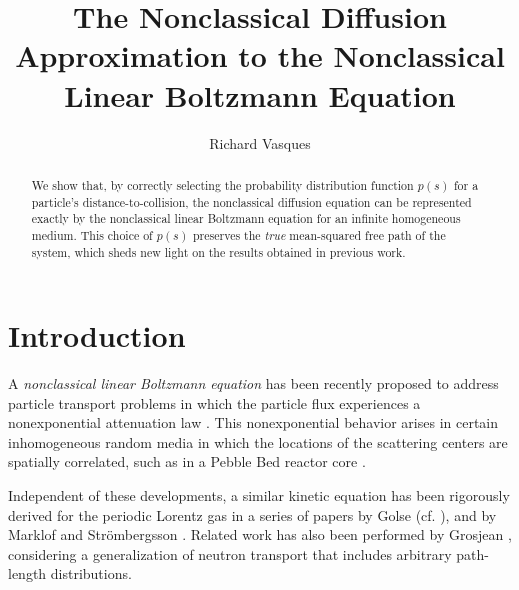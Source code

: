 \documentclass[preprint,12pt]{elsarticle}
\begin{document}
\begin{frontmatter}


\title{The Nonclassical Diffusion Approximation to the Nonclassical Linear Boltzmann Equation}

\author[ucb]{Richard Vasques}
\address[ucb]{Department of Nuclear Engineering, University of California, Berkeley}

\begin{abstract}

We show that, by correctly selecting the probability distribution function $p(s)$ for a particle's distance-to-collision, the nonclassical diffusion equation can be represented exactly by the nonclassical linear Boltzmann equation for an infinite homogeneous medium. This choice of $p(s)$ preserves the \textit{true} mean-squared free path of the system, which sheds new light on the results obtained in previous work.

\end{abstract}



\end{frontmatter}

\section{Introduction}\label{sec1}
\setcounter{section}{1}
\setcounter{equation}{0} 

A \textit{nonclassical linear Boltzmann equation} has been recently proposed to address particle transport problems in which the particle flux experiences a nonexponential attenuation law \cite{larsen_11, frank_10, vasques_14a}. This nonexponential behavior arises in certain inhomogeneous random media in which the locations of the scattering centers are spatially correlated, such as in a Pebble Bed reactor core \cite{larsen_11, vasques_13, vasques_14b}. 

Independent of these developments, a similar kinetic equation has been
rigorously derived for the periodic Lorentz gas in a series of papers by Golse (cf. \cite{golse_12}), and by Marklof and Str\" ombergsson \cite{marklof_11, marklof_15}. Related work has also been performed by Grosjean \cite{grosjean_51}, considering a generalization of
neutron transport that includes arbitrary path-length distributions.
\end{document}
